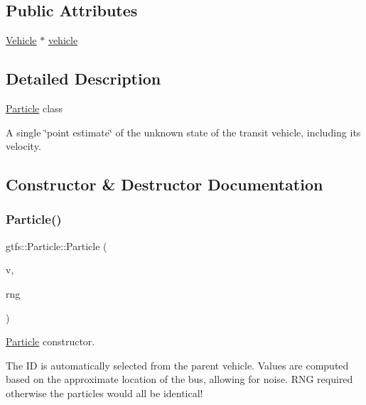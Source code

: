 \subsection*{Public Attributes}
\begin{DoxyCompactItemize}
\item 
\hyperlink{classgtfs_1_1Vehicle}{Vehicle} $\ast$ \hyperlink{classgtfs_1_1Particle_a81c313d505ecb592d79463f167dfb76c}{vehicle}
\end{DoxyCompactItemize}


\subsection{Detailed Description}
\hyperlink{classgtfs_1_1Particle}{Particle} class

A single \char`\"{}point estimate\char`\"{} of the unknown state of the transit vehicle, including its velocity. 

\subsection{Constructor \& Destructor Documentation}
\mbox{\label{classgtfs_1_1Particle_ae59d459c6ff20eb081a933b304289794}} 
\subsubsection{\texorpdfstring{Particle()}{Particle()}\hspace{0.1cm}{\footnotesize\ttfamily [1/2]}}
{\footnotesize\ttfamily gtfs\+::\+Particle\+::\+Particle (\begin{DoxyParamCaption}\item[{\hyperlink{classgtfs_1_1Vehicle}{Vehicle} $\ast$}]{v,  }\item[{\hyperlink{classsampling_1_1RNG}{sampling\+::\+R\+NG} \&}]{rng }\end{DoxyParamCaption})}

\hyperlink{classgtfs_1_1Particle}{Particle} constructor.

The ID is automatically selected from the parent vehicle. Values are computed based on the approximate location of the bus, allowing for noise. R\+NG required otherwise the particles would all be identical! \mbox{\label{classgtfs_1_1Particle_ac386e64b43b1e317063f9a6666d604ce}} 
